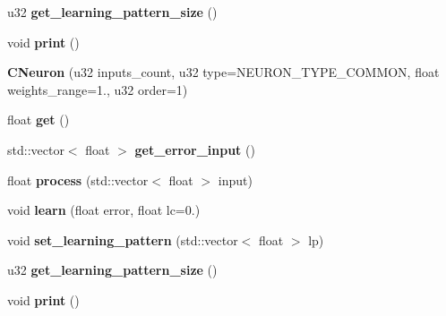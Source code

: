 \begin{DoxyCompactItemize}
\item 
\hypertarget{classCNeuron_ad3cfde2fc3314e525345e8ec6595b1cb}{u32 {\bfseries get\-\_\-learning\-\_\-pattern\-\_\-size} ()}\label{classCNeuron_ad3cfde2fc3314e525345e8ec6595b1cb}

\item 
\hypertarget{classCNeuron_a37db8b58d3d3cd00c2cdc12b0a7466b3}{void {\bfseries print} ()}\label{classCNeuron_a37db8b58d3d3cd00c2cdc12b0a7466b3}

\item 
\hypertarget{classCNeuron_ae9f32d41d2bb7b9683a440e038f5b6f6}{{\bfseries C\-Neuron} (u32 inputs\-\_\-count, u32 type=N\-E\-U\-R\-O\-N\-\_\-\-T\-Y\-P\-E\-\_\-\-C\-O\-M\-M\-O\-N, float weights\-\_\-range=1., u32 order=1)}\label{classCNeuron_ae9f32d41d2bb7b9683a440e038f5b6f6}

\item 
\hypertarget{classCNeuron_af97048090878729c7d99dcb8363e61ff}{float {\bfseries get} ()}\label{classCNeuron_af97048090878729c7d99dcb8363e61ff}

\item 
\hypertarget{classCNeuron_a50f6d18278e8fa7cd4d189657b019989}{std\-::vector$<$ float $>$ {\bfseries get\-\_\-error\-\_\-input} ()}\label{classCNeuron_a50f6d18278e8fa7cd4d189657b019989}

\item 
\hypertarget{classCNeuron_a0b9c5ff02de4dae0f2bc98d81810d597}{float {\bfseries process} (std\-::vector$<$ float $>$ input)}\label{classCNeuron_a0b9c5ff02de4dae0f2bc98d81810d597}

\item 
\hypertarget{classCNeuron_a64eb412ce09f2f59077281d86a085303}{void {\bfseries learn} (float error, float lc=0.)}\label{classCNeuron_a64eb412ce09f2f59077281d86a085303}

\item 
\hypertarget{classCNeuron_a0bcb7781406fa9a282eaafe4b154b5b6}{void {\bfseries set\-\_\-learning\-\_\-pattern} (std\-::vector$<$ float $>$ lp)}\label{classCNeuron_a0bcb7781406fa9a282eaafe4b154b5b6}

\item 
\hypertarget{classCNeuron_ad3cfde2fc3314e525345e8ec6595b1cb}{u32 {\bfseries get\-\_\-learning\-\_\-pattern\-\_\-size} ()}\label{classCNeuron_ad3cfde2fc3314e525345e8ec6595b1cb}

\item 
\hypertarget{classCNeuron_a37db8b58d3d3cd00c2cdc12b0a7466b3}{void {\bfseries print} ()}\label{classCNeuron_a37db8b58d3d3cd00c2cdc12b0a7466b3}


\end{DoxyCompactItemize}
